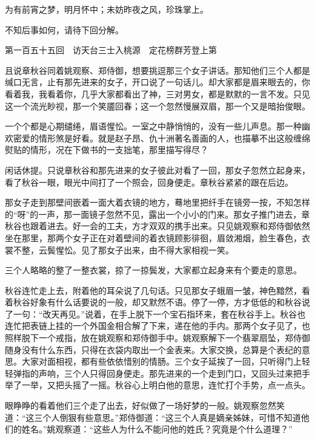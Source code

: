 \documentclass[12pt,UTF8]{ctexbook}
\begin{document}
{{{为有前宵之梦，明月怀中；未妨昨夜之风，珍珠掌上。

不知后事如何，请待下回分解。





第一百五十五回　访天台三士入桃源　定花榜群芳登上第





且说章秋谷同着姚观察、郑侍御，想要挑逗那三个女子讲话。那知他们三个人都是缄口无言，止有那先进来的女子，开口说了一句话儿。却大家都是眉来眼去的，你看着我，我看着你，几乎大家都看出了神，三对男女，都是默默的一言不发。只见这一个流光眇视，那一个笑靥回春；这一个忽然慢展双眉，那一个又是暗抬俊眼。

一个个都是心期缱绻，眉语惺忪。一室之中静悄悄的，没有一些儿声息。那一种幽欢密爱的情形煞是好看。就是赵子昂、仇十洲著名善画的人，也描摹不出这般缠绵熨贴的情形，况在下做书的一支拙笔，那里描写得尽？

闲话休提。只说章秋谷和那先进来的女子彼此对看了一回，那女子忽然立起身来，看了秋谷一眼，眼光中间打了一个照会，回身便走。章秋谷紧紧的跟在后边。

那女子走到那壁间嵌着一面大着衣镜的地方，蓦地里把纤手在镜旁一按，不知怎样的“呀”的一声，那一面镜子忽然不见，露出一个小小的门来。那女子推门进去，章秋谷也跟着进去。好一会的工夫，方才双双的携手出来。只见姚观察和郑侍御依然坐在那里，那两个女子正在对着壁间的着衣镜顾影徘徊，眉敛湘烟，脸生春色，衣裳不整，云鬓惺忪。见了那女子出来，由不得大家相视一笑。

三个人略略的整了一整衣裳，掠了一掠鬓发，大家都立起身来有个要走的意思。

秋谷连忙走上去，附着他的耳朵说了几句话。只见那女子蛾眉一皱，神色黯然，看着秋谷好象有什么话要说的一般，却又默然不语。停了一停，方才低低的和秋谷说了一句：“改天再见。”说着，在手上脱下一个宝石指环来，套在秋谷手上。秋谷也连忙把表链上挂的一个外国金相合解了下来，递在他的手内。那两个女子见了，也照样脱下一个戒指，放在姚观察和郑侍御手中。姚观察解下一个翡翠扇坠，郑侍御随身没有什么东西，只得在衣袋内取出一个金表来。大家交换，总算是个表纪的意思。大家对面相视，都有些依依惜别的情肠。三个女子延挨了一回，只听得门上轻轻弹指的声响，三个人只得回身便走。那先进来的一个走到门口，又回头过来把手举了一举，又把头摇了一摇。秋谷心上明白他的意思，连忙打个手势，点一点头。

眼睁睁的看着他们三个走了出去，好似做了一场好梦的一般。姚观察忽然笑道：“这三个人倒狠有些意思。”郑侍御道：“这三个人真是嫡亲姊妹，可惜不知道他们的姓名。”姚观察道：“这些人为什么不能问他的姓氏？究竟是个什么道理？”

}}}
\end{document}
